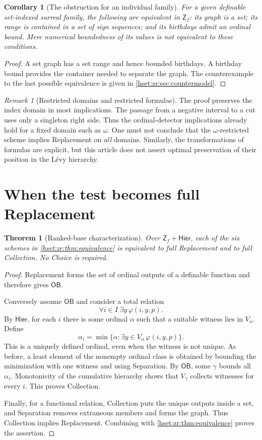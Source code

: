 \documentclass[11pt,letterpaper]{article}
\newtheorem{theorem}{Theorem}[section]
\newtheorem{corollary}[corollary]{Corollary}\aliascntresetthe{corollary}
\theoremstyle{definition}
\theoremstyle{remark}
\newtheorem{remark}[remark]{Remark}\aliascntresetthe{remark}
\newcommand{\Zf}{\mathsf{Z}_{\!f}}
\newcommand{\Hier}{\mathsf{Hier}}
\newcommand{\OB}{\mathsf{OB}}
\begin{document}
\begin{corollary}[The obstruction for an individual family]
\label{hset:zr:cor:individual}
For a given definable set-indexed surreal family, the following are equivalent in $\Zf$: its graph is a set; its range is contained in a set of sign sequences; and its birthdays admit an ordinal bound. Mere numerical boundedness of its values is not equivalent to these conditions.
\end{corollary}
\begin{proof}
A set graph has a set range and hence bounded birthdays. A birthday bound provides the container needed to separate the graph. The counterexample to the last possible equivalence is given in \cref{hset:zr:sec:countermodel}.
\end{proof}

\begin{remark}[Restricted domains and restricted formulas]
The proof preserves the index domain in most implications. The passage from a negative interval to a cut uses only a singleton right side. Thus the ordinal-detector implications already hold for a fixed domain such as $\omega$. One must not conclude that the $\omega$-restricted scheme implies Replacement on \emph{all} domains. Similarly, the transformations of formulas are explicit, but this article does not assert optimal preservation of their position in the L\'evy hierarchy.
\end{remark}

\section{When the test becomes full Replacement}
\label{hset:zr:sec:ranked}

\begin{theorem}[Ranked-base characterization]
\label{hset:zr:thm:ranked}
Over $\Zf+\Hier$, each of the six schemes in \cref{hset:zr:thm:equivalence} is equivalent to full Replacement and to full Collection. No Choice is required.
\end{theorem}
\begin{proof}
Replacement forms the set of ordinal outputs of a definable function and therefore gives $\OB$.

Conversely assume $\OB$ and consider a total relation
\[
\forall i\in I\;\exists y\,\varphi(i,y,p).
\]
By $\Hier$, for each $i$ there is some ordinal $\alpha$ such that a suitable witness lies in $V_\alpha$. Define
\[
\alpha_i=\min\{\alpha:\exists y\in V_\alpha\,\varphi(i,y,p)\}.
\]
This is a uniquely defined ordinal, even when the witness is not unique. As before, a least element of the nonempty ordinal class is obtained by bounding the minimization with one witness and using Separation. By $\OB$, some $\gamma$ bounds all $\alpha_i$. Monotonicity of the cumulative hierarchy shows that $V_\gamma$ collects witnesses for every $i$. This proves Collection.

Finally, for a functional relation, Collection puts the unique outputs inside a set, and Separation removes extraneous members and forms the graph. Thus Collection implies Replacement. Combining with \cref{hset:zr:thm:equivalence} proves the assertion.
\end{proof}
\end{document}
